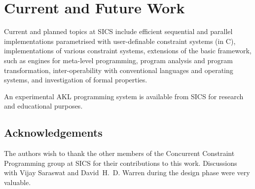 \section{Current and Future Work}

Current and planned topics at SICS include efficient sequential and
parallel implementations parametrised with user-definable constraint
systems (in C), implementations of various constraint systems,
extensions of the basic framework, such as engines for meta-level
programming, program analysis and program transformation,
inter-operability with conventional languages and operating systems,
and investigation of formal properties.

An experimental AKL programming system is available from SICS for
research and educational purposes.

\subsection*{Acknowledgements}

The authors wish to thank the other members of the Concurrent
Constraint Programming group at SICS for their contributions to this
work.  Discussions with Vijay Saraswat and David~H.~D. Warren during
the design phase were very valuable.





